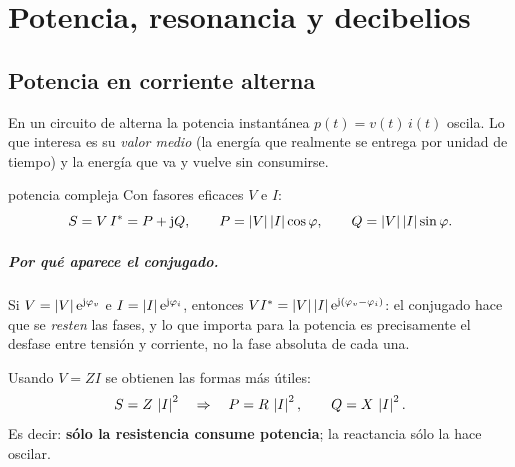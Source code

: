 \chapter{Potencia, resonancia y decibelios}

\section{Potencia en corriente alterna}

En un circuito de alterna la potencia instantánea $p(t) = v(t)\,i(t)$ oscila. Lo que interesa es su \emph{valor medio}
(la energía que realmente se entrega por unidad de tiempo) y la energía que va y vuelve sin consumirse.

\begin{definicion}{potencia compleja}
Con fasores eficaces $V$ e $I$:
\begin{equation}
  S = V\,I^{*} = P + \mathrm{j} Q, \qquad P = \left|V\right|\left|I\right|\cos\varphi, \qquad Q = \left|V\right|\left|I\right|\sin\varphi .
\end{equation}
\begin{donde}
\end{donde}
\end{definicion}

\paragraph{Por qué aparece el conjugado.} Si $V = \left|V\right|\mathrm{e}^{\mathrm{j}\varphi_v}$ e $I = \left|I\right|\mathrm{e}^{\mathrm{j}\varphi_i}$, entonces
$VI^{*} = \left|V\right|\left|I\right|\mathrm{e}^{\mathrm{j}(\varphi_v - \varphi_i)}$: el conjugado hace que se \emph{resten} las fases, y lo que importa
para la potencia es precisamente el desfase entre tensión y corriente, no la fase absoluta de cada una.

Usando $V = Z I$ se obtienen las formas más útiles:
\begin{equation}
  S = Z\,\left|I\right|^2 \quad\Rightarrow\quad P = R\,\left|I\right|^2, \qquad Q = X\,\left|I\right|^2 .
\end{equation}
Es decir: \textbf{sólo la resistencia consume potencia}; la reactancia sólo la hace oscilar.

